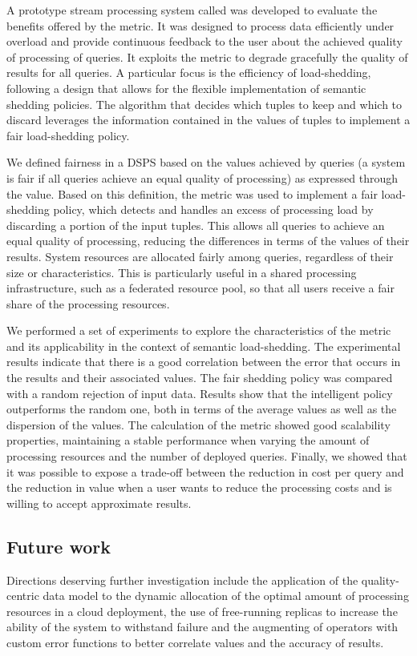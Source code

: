 A prototype stream processing system called \sys was developed to evaluate the benefits offered by the
\sic metric. It was designed to process data efficiently under overload and provide continuous feedback
to the user about the achieved quality of processing of queries.
It exploits the \sic metric to degrade gracefully the quality of results for all queries. A particular
focus is the efficiency of \mbox{load-shedding}, following a design that allows for the
flexible implementation of semantic shedding policies. 
The algorithm that decides which tuples to keep and which to discard leverages the information contained
in the \sic values of tuples to implement a fair load-shedding policy.

We defined fairness in a DSPS based on the \sic values achieved by queries (\ie a system is fair if all
queries achieve an equal quality of processing) as expressed through the \sic value.
Based on this definition, the \sic metric was used to implement a fair load-shedding policy, which
detects and handles an excess of processing load by discarding a portion of the input tuples. This allows
all queries to achieve an equal quality of processing, reducing the differences in terms of the \sic
values of their results.
System resources are allocated fairly among queries, regardless of their size or characteristics.
This is particularly useful in a shared processing infrastructure, such as a federated resource pool, so
that all users receive a fair share of the processing resources.

We performed a set of experiments to explore the characteristics of the \sic metric and its
applicability in the context of semantic load-shedding. The experimental results indicate that there is a
good correlation between the error that occurs in the results and their associated \sic values. The
fair shedding policy was compared with a random rejection of input data. Results show that the
intelligent policy outperforms the random one, both in terms of the average \sic values as well as the
dispersion of the values. The calculation of the \sic metric showed good scalability properties,
maintaining a stable performance when varying the amount of processing resources and the number of
deployed queries. Finally, we showed that it was possible to expose a trade-off between the reduction in
cost per query and the reduction in \sic value when a user wants to reduce the processing costs and is willing to accept approximate results.
\\
\subsection*{Future work} 
Directions deserving further investigation include the application of the quality-centric data model to
the dynamic allocation of the optimal amount of processing resources in a cloud deployment, the use
of free-running replicas to increase the ability of the system to withstand failure and the augmenting of
operators with custom error functions to better correlate \sic values and the accuracy of results.

